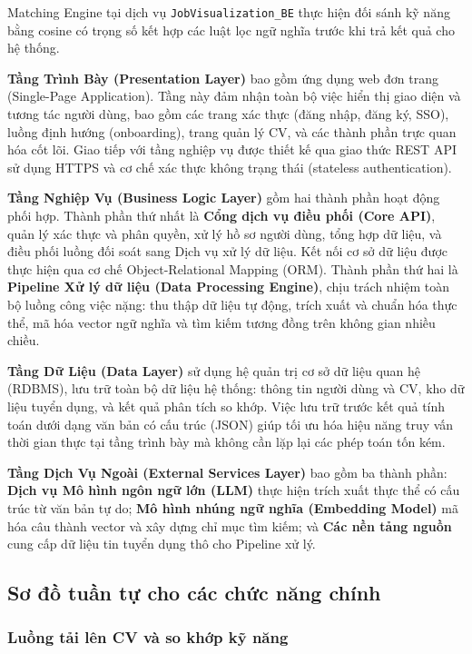 Matching Engine tại dịch vụ \texttt{JobVisualization\_\allowbreak BE} thực hiện đối sánh kỹ năng bằng cosine có trọng số kết hợp các luật lọc ngữ nghĩa trước khi trả kết quả cho hệ thống.

\textbf{Tầng Trình Bày (Presentation Layer)} bao gồm ứng dụng web đơn trang (Single-Page Application). Tầng này đảm nhận toàn bộ việc hiển thị giao diện và tương tác người dùng, bao gồm các trang xác thực (đăng nhập, đăng ký, SSO), luồng định hướng (onboarding), trang quản lý CV, và các thành phần trực quan hóa cốt lõi. Giao tiếp với tầng nghiệp vụ được thiết kế qua giao thức REST API sử dụng HTTPS và cơ chế xác thực không trạng thái (stateless authentication).

\textbf{Tầng Nghiệp Vụ (Business Logic Layer)} gồm hai thành phần hoạt động phối hợp. Thành phần thứ nhất là \textbf{Cổng dịch vụ điều phối (Core API)}, quản lý xác thực và phân quyền, xử lý hồ sơ người dùng, tổng hợp dữ liệu, và điều phối luồng đối soát sang Dịch vụ xử lý dữ liệu. Kết nối cơ sở dữ liệu được thực hiện qua cơ chế Object-Relational Mapping (ORM). Thành phần thứ hai là \textbf{Pipeline Xử lý dữ liệu (Data Processing Engine)}, chịu trách nhiệm toàn bộ luồng công việc nặng: thu thập dữ liệu tự động, trích xuất và chuẩn hóa thực thể, mã hóa vector ngữ nghĩa và tìm kiếm tương đồng trên không gian nhiều chiều.

\textbf{Tầng Dữ Liệu (Data Layer)} sử dụng hệ quản trị cơ sở dữ liệu quan hệ (RDBMS), lưu trữ toàn bộ dữ liệu hệ thống: thông tin người dùng và CV, kho dữ liệu tuyển dụng, và kết quả phân tích so khớp. Việc lưu trữ trước kết quả tính toán dưới dạng văn bản có cấu trúc (JSON) giúp tối ưu hóa hiệu năng truy vấn thời gian thực tại tầng trình bày mà không cần lặp lại các phép toán tốn kém.

\textbf{Tầng Dịch Vụ Ngoài (External Services Layer)} bao gồm ba thành phần: \textbf{Dịch vụ Mô hình ngôn ngữ lớn (LLM)} thực hiện trích xuất thực thể có cấu trúc từ văn bản tự do; \textbf{Mô hình nhúng ngữ nghĩa (Embedding Model)} mã hóa câu thành vector và xây dựng chỉ mục tìm kiếm; và \textbf{Các nền tảng nguồn} cung cấp dữ liệu tin tuyển dụng thô cho Pipeline xử lý.

\subsection{Sơ đồ tuần tự cho các chức năng chính}

\subsubsection*{Luồng tải lên CV và so khớp kỹ năng}

